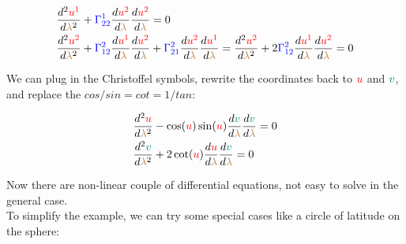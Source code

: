 \begin{align*}
    &\frac{d^2 \begingroup\color{red}u^1\endgroup}{d\begingroup\color{brown}\lambda\endgroup^2} + \begingroup\color{blue}\Gamma^{1}_{22}\endgroup \frac{d \begingroup\color{red}u^2\endgroup}{d\begingroup\color{brown}\lambda\endgroup} \frac{d \begingroup\color{red}u^2\endgroup}{d\begingroup\color{brown}\lambda\endgroup} = 0 \\
    &\frac{d^2 \begingroup\color{red}u^2\endgroup}{d\begingroup\color{brown}\lambda\endgroup^2} + \begingroup\color{blue}\Gamma^{2}_{12}\endgroup \frac{d \begingroup\color{red}u^1\endgroup}{d\begingroup\color{brown}\lambda\endgroup} \frac{d \begingroup\color{red}u^2\endgroup}{d\begingroup\color{brown}\lambda\endgroup} + \begingroup\color{blue}\Gamma^{2}_{21}\endgroup \frac{d \begingroup\color{red}u^2\endgroup}{d\begingroup\color{brown}\lambda\endgroup} \frac{d \begingroup\color{red}u^1\endgroup}{d\begingroup\color{brown}\lambda\endgroup} = \frac{d^2 \begingroup\color{red}u^2\endgroup}{d\begingroup\color{brown}\lambda\endgroup^2} + 2\begingroup\color{blue}\Gamma^{2}_{12}\endgroup \frac{d \begingroup\color{red}u^1\endgroup}{d\begingroup\color{brown}\lambda\endgroup} \frac{d \begingroup\color{red}u^2\endgroup}{d\begingroup\color{brown}\lambda\endgroup} = 0 \\
\end{align*}

We can plug in the Christoffel symbols, rewrite the coordinates back to $\color{red}u$ and $\color{teal}v$, and replace the $cos/sin = cot = 1/tan$:

\begin{align*}
    &\frac{d^2 \begingroup\color{red}u\endgroup}{d\begingroup\color{brown}\lambda\endgroup^2} -\cos(\begingroup\color{red}u\endgroup)\sin(\begingroup\color{red}u\endgroup) \frac{d \begingroup\color{teal}v\endgroup}{d\begingroup\color{brown}\lambda\endgroup} \frac{d \begingroup\color{teal}v\endgroup}{d\begingroup\color{brown}\lambda\endgroup} = 0 \\
    &\frac{d^2 \begingroup\color{teal}v\endgroup}{d\begingroup\color{brown}\lambda\endgroup^2} + 2 \cot(\begingroup\color{red}u\endgroup)\frac{d \begingroup\color{red}u\endgroup}{d\begingroup\color{brown}\lambda\endgroup} \frac{d \begingroup\color{teal}v\endgroup}{d\begingroup\color{brown}\lambda\endgroup} = 0 \\
\end{align*}

Now there are non-linear couple of differential equations, not easy to solve in the general case.\\
To simplify the example, we can try some special cases like a circle of latitude on the sphere:

